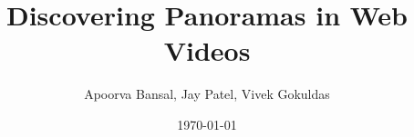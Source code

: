 \documentclass[10pt]{article}
\author{Apoorva Bansal, Jay Patel, Vivek Gokuldas}
\title{Discovering Panoramas in Web Videos}
\date{\today}
\begin{document}
\maketitle



\begin{multicols}{2}











\end{multicols}
\end{document}
